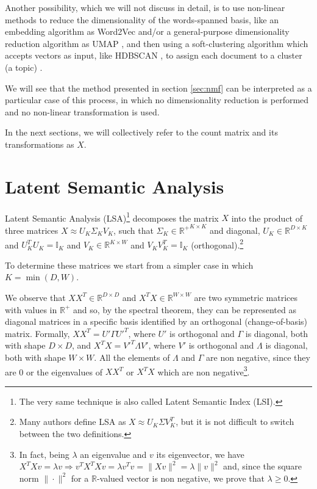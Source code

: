 \documentclass[11pt, a4paper, oneside, openright]{book}
\begin{document}
Another possibility, which we will not discuss in detail, is to use non-linear methods to reduce the dimensionality of the words-spanned basis, like an embedding algorithm as Word2Vec \parencite{mikolov2013} and/or a general-purpose dimensionality reduction algorithm as UMAP \parencite{mcinnes2020}, and then using a soft-clustering algorithm which accepts vectors as input, like HDBSCAN \parencite{campello2013}, to assign each document to a cluster (a topic) \parencite{angelov2020, grootendorst2021}.

We will see that the method presented in section \ref{sec:nmf} can be interpreted as a particular case of this process, in which no dimensionality reduction is performed and no non-linear transformation is used.

In the next sections, we will collectively refer to the count matrix and its transformations as $X$.

\section{Latent Semantic Analysis}
Latent Semantic Analysis (LSA)\footnote{The very same technique is also called Latent Semantic Index (LSI).} \parencite{deerwester1990} decomposes the matrix $X$ into the product of three matrices $X\approx U_K \Sigma_K V_K$, such that $\Sigma_K \in {\mathbb{R}^+}^{K\times K}$ and diagonal, $U_K \in \mathbb{R}^{D\times K}$ and $U_K^T U_K=\mathbb{I}_K$ and $V_K \in \mathbb{R}^{K\times W}$ and $V_K V_K^T=\mathbb{I}_K$ (orthogonal).\footnote{Many authors define LSA as $X \approx U_K \Sigma V_K^T$, but it is not difficult to switch between the two definitions.}

To determine these matrices we start from a simpler case in which $K=\min(D,W)$.

We observe that $XX^T \in \mathbb{R}^{D\times D}$ and $X^T X \in \mathbb{R}^{W\times W}$ are two symmetric matrices with values in $\mathbb{R}^+$ and so, by the spectral theorem, they can be represented as diagonal matrices in a specific basis identified by an orthogonal (change-of-basis) matrix. Formally, $XX^T = U' \Gamma U'^T$, where $U'$ is orthogonal and $\Gamma$ is diagonal, both with shape $D \times D$, and $X^T X = V'^T \Lambda V'$, where $V'$ is orthogonal and $\Lambda$ is diagonal, both with shape $W\times W$.
All the elements of $\Lambda$ and $\Gamma$ are non negative, since they are 0 or the eigenvalues of $XX^T$ or $X^TX$ which are non negative\footnote{In fact, being $\lambda$ an eigenvalue and $v$ its eigenvector, we have $X^TXv=\lambda v \Rightarrow v^TX^TXv=\lambda v^Tv = \|Xv\|^2=\lambda \|v\|^2$ and, since the square norm $\|\cdot\|^2$ for a $\mathbb{R}$-valued vector is non negative, we prove that $\lambda \geq 0$.}.
\end{document}
